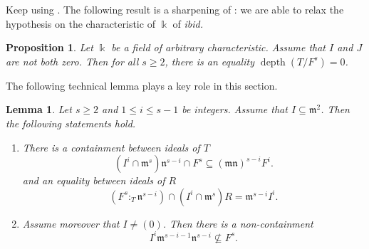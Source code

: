 \documentclass{amsart}
\DeclareMathOperator{\depth}{depth}
\newcommand{\mm}{\mathfrak{m}}
\newcommand{\nn}{\mathfrak{n}}
\theoremstyle{plain}
\newtheorem{prop}[thm]{Proposition}
\newtheorem{lem}[thm]{Lemma}
\theoremstyle{definition}
\numberwithin{equation}{section}
\newcommand{\kk}{\Bbbk}
\begin{document}
Keep using . The following result is a sharpening of \cite[Theorem 6.1]{NgV19b}: we are able to relax the hypothesis on the characteristic of $\kk$ of \emph{ibid.}
\begin{prop}
\label{prop_depthordinarypower_0}
Let $\kk$ be a field of arbitrary characteristic. Assume that $I$ and $J$ are not both zero. Then for all $s\ge 2$, there is an equality $\depth(T/F^s)=0$.
\end{prop}
The following technical lemma plays a key role in this section.
\begin{lem}
\label{lem_noncontainmentsandcontainments}
Let $s\ge 2$ and $1\le i\le s-1$ be integers. Assume that $I\subseteq \mm^2$. Then the following statements hold.
\begin{enumerate}[\quad \rm (1)]
\item There is a containment between ideals of $T$
\begin{equation*}
(I^i\cap \mm^s)\nn^{s-i}\cap F^s \subseteq (\mm\nn)^{s-i}F^i. 
\end{equation*}
and an equality between ideals of $R$
\[
(F^s:_T\nn^{s-i}) \cap (I^i\cap \mm^s)R=\mm^{s-i}I^i.
\]
\item Assume moreover that $I\neq (0)$. Then there is a non-containment 
$$
I^i\mm^{s-i-1}\nn^{s-i}\not\subseteq F^s.
$$
\end{enumerate}
\end{lem}
\end{document}
